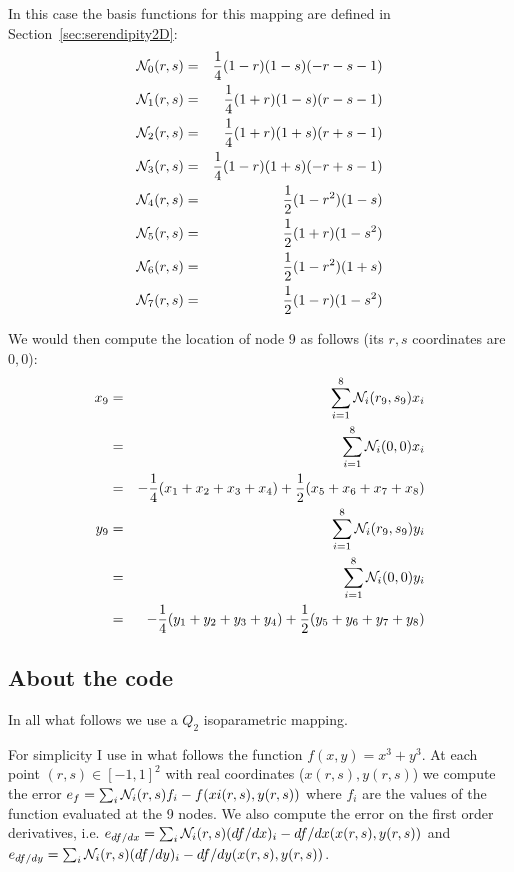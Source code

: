 \begin{itemize}
In this case the basis functions for this mapping are defined in Section~\ref{sec:serendipity2D}:
\begin{eqnarray}
{\mathcal{N}}_0(r,s)&=& \frac{1}{4}(1-r)(1-s)(-r-s-1) \nonumber\\
{\mathcal{N}}_1(r,s)&=& \frac{1}{4}(1+r)(1-s)(r-s-1) \nonumber\\
{\mathcal{N}}_2(r,s)&=& \frac{1}{4}(1+r)(1+s)(r+s-1) \nonumber\\
{\mathcal{N}}_3(r,s)&=& \frac{1}{4}(1-r)(1+s)(-r+s-1) \nonumber\\
{\mathcal{N}}_4(r,s)&=& \frac{1}{2}(1-r^2)(1-s)  \nonumber\\
{\mathcal{N}}_5(r,s)&=& \frac{1}{2}(1+r)  (1-s^2)\nonumber\\
{\mathcal{N}}_6(r,s)&=& \frac{1}{2}(1-r^2)(1+s)  \nonumber\\
{\mathcal{N}}_7(r,s)&=& \frac{1}{2}(1-r)  (1-s^2) \nonumber
\end{eqnarray}

We would then compute the location of node 9 as follows (its $r,s$ coordinates are $0,0$): 
\begin{eqnarray}
x_9 
&=& \sum_{i=1}^8 {\mathcal{N}}_i (r_9,s_9) x_i \nonumber\\
&=& \sum_{i=1}^8 {\mathcal{N}}_i (0,0) x_i \nonumber\\
&=& -\frac14 (x_1+x_2+x_3+x_4) + \frac12 (x_5+x_6+x_7+x_8) \nonumber\\
y_9 
&=& \sum_{i=1}^8 {\mathcal{N}}_i (r_9,s_9) y_i \nonumber\\
&=& \sum_{i=1}^8 {\mathcal{N}}_i (0,0) y_i \nonumber\\
&=& -\frac14 (y_1+y_2+y_3+y_4) + \frac12 (y_5+y_6+y_7+y_8) \nonumber
\end{eqnarray}


\end{itemize}

\subsection*{About the code}

In all what follows we use a $Q_2$ isoparametric mapping.

For simplicity I use in what follows the function $f(x,y)=x^3+y^3$.
At each point $(r,s)\in [-1,1]^2$ with real coordinates ($x(r,s),y(r,s)$) 
we compute the error $e_f=\sum_i {\mathcal{N}}_i(r,s) f_i  - f(xi(r,s),y(r,s))$ 
where $f_i$ are the values of the function evaluated at the 9 nodes.
We also compute the error on the first order derivatives, i.e.
$e_{df/dx}=\sum_i {\mathcal{N}}_i(r,s) (df/dx)_i  - df/dx(x(r,s),y(r,s))$ 
and $e_{df/dy}=\sum_i {\mathcal{N}}_i(r,s) (df/dy)_i  - df/dy(x(r,s),y(r,s))$.

